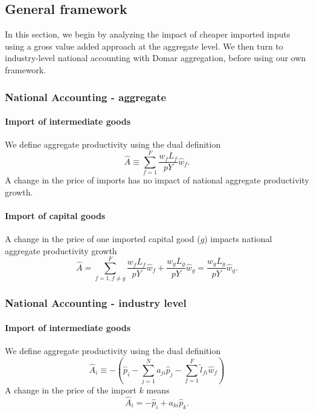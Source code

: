 \documentclass[11pt]{article}
\begin{document}
\subsection{General framework}
In this section, we begin by analyzing the impact of cheaper imported inputs using a gross value added approach at the aggregate level. We then turn to industry-level national accounting with Domar aggregation, before using our own framework.

\subsubsection{National Accounting - aggregate}
\paragraph{Import of intermediate goods} We define aggregate productivity using the dual definition
\begin{equation}
    \hat{A}\equiv \sum_{f=1}^F \frac{w_fL_{f}}{pY}\hat{w}_f.
\end{equation}
A change in the price of imports has no impact of national aggregate productivity growth. 

\paragraph{Import of capital goods} 
A change in the price of one imported capital good ($g$) impacts national aggregate productivity growth
\begin{equation}
    \hat{A}= \sum_{f=1, f\neq g}^F \frac{w_fL_{f}}{pY}\hat{w}_f+\frac{w_gL_{g}}{pY}\hat{w}_g=\frac{w_gL_{g}}{pY}\hat{w}_g.
\end{equation}


\subsubsection{National Accounting - industry level}


\paragraph{Import of intermediate goods} We define aggregate productivity using the dual definition
\begin{equation}
    \hat{A}_i \equiv  - \left( \hat{p}_i - \sum_{j=1}^N  a_{ji} \hat{p}_j - \sum_{f=1}^F \tilde{l}_{fi} \hat{w}_f \right)
\end{equation}
A change in the price of the import $k$ means
\begin{equation}
    \hat{A}_i=  - \hat{p}_i + a_{k i} \hat{p}_{k}.
\end{equation}
\end{document}
